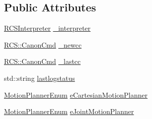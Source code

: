 \subsection*{Public Attributes}
\begin{DoxyCompactItemize}
\item 
\hyperlink{classRCSInterpreter}{R\-C\-S\-Interpreter} \hyperlink{structRCS_1_1CController_a4c3c287cebfd9fa9fb413205fa0b49f6}{\-\_\-interpreter}
\item 
\hyperlink{structRCS_1_1CanonCmd}{R\-C\-S\-::\-Canon\-Cmd} \hyperlink{structRCS_1_1CController_adb6c26898d07eb95d78cb4a9c3b32f5e}{\-\_\-newcc}
\item 
\hyperlink{structRCS_1_1CanonCmd}{R\-C\-S\-::\-Canon\-Cmd} \hyperlink{structRCS_1_1CController_a042ac2e4f8765bf58abed979afd2ba20}{\-\_\-lastcc}
\item 
std\-::string \hyperlink{structRCS_1_1CController_a8bd2705747d1e16f5806ddf183bfade7}{lastlogstatus}
\item 
\hyperlink{structRCS_1_1CController_a50ede7cd9f47204828f0f7c740dc09b1}{Motion\-Planner\-Enum} \hyperlink{structRCS_1_1CController_a4174fd5467045e780fe53bde42e70735}{e\-Cartesian\-Motion\-Planner}
\item 
\hyperlink{structRCS_1_1CController_a50ede7cd9f47204828f0f7c740dc09b1}{Motion\-Planner\-Enum} \hyperlink{structRCS_1_1CController_ad788d0def2101be74b680394bcbc78e7}{e\-Joint\-Motion\-Planner}
\end{DoxyCompactItemize}
